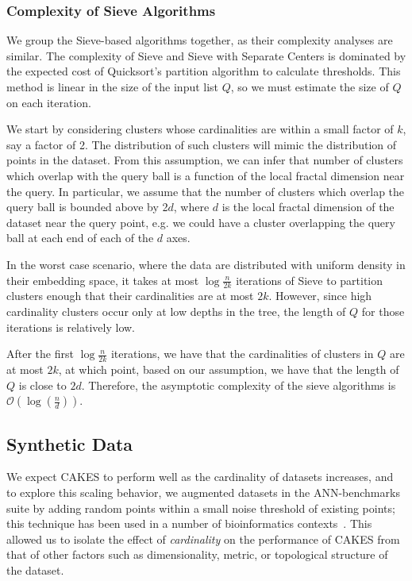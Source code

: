 \subsubsection{Complexity of Sieve Algorithms}
\label{paragraph:methods:sieve-complexity}

We group the Sieve-based algorithms together, as their complexity analyses are similar.
The complexity of Sieve and Sieve with Separate Centers is dominated by the expected cost of Quicksort's partition algorithm to calculate thresholds.
This method is linear in the size of the input list $Q$, so we must estimate the size of $Q$ on each iteration. 

We start by considering clusters whose cardinalities are within a small factor of $k$, say a factor of 2.
The distribution of such clusters will mimic the distribution of points in the dataset. 
From this assumption, we can infer that number of clusters which overlap with the query ball is a function of the local fractal dimension near the query.
In particular, we assume that the number of clusters which overlap the query ball is bounded above by 2$d$, where $d$ is the local fractal dimension of the dataset near the query point, e.g. we could have a cluster overlapping the query ball at each end of each of the $d$ axes.

In the worst case scenario, where the data are distributed with uniform density in their embedding space, it takes at most $\log{\frac{n}{2k}}$ iterations of Sieve to partition clusters enough that their cardinalities are at most $2k$.
However, since high cardinality clusters occur only at low depths in the tree, the length of $Q$ for those iterations is relatively low. 

After the first $\log{\frac{n}{2k}}$ iterations, we have that the cardinalities of clusters in $Q$ are at most $2k$, at which point, based on our assumption, we have that the length of $Q$ is close to $2d$.
Therefore, the asymptotic complexity of the sieve algorithms is $\mathcal{O}\left(\log(\frac{n}{d})\right)$.

\subsection{Synthetic Data}
\label{subsec:methods:synthetic-data}

We expect CAKES to perform well as the cardinality of datasets increases, and to explore this scaling behavior, we augmented datasets in the ANN-benchmarks suite by adding random points within a 
small noise threshold of existing points; this technique has been used in a number of bioinformatics contexts~\cite{kumar2009augmented, kumar2010recognition, daniels2012smurflite, velasco2018combining, lu2020evolution}. This allowed us to isolate the effect of \emph{cardinality} on the performance of CAKES 
from that of other factors such as dimensionality, metric, or topological structure of the dataset. 


